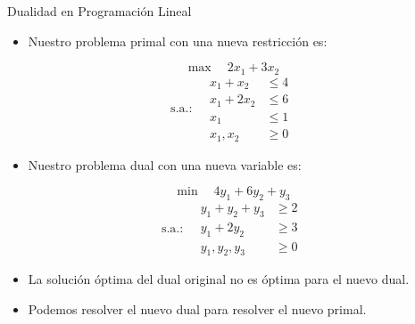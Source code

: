 \documentclass{beamer}
\begin{document}
\begin{frame}{Dualidad en Programación Lineal}
    \begin{itemize}
        \item Nuestro problema primal con una nueva restricción es:
    \end{itemize}

    \[
    \max \quad 2x_1 + 3x_2
    \]
    \[
    \text{s.a.:} \quad
    \begin{aligned}
        x_1 + x_2 &\leq 4 \\
        x_1 + 2x_2 &\leq 6 \\
        x_1 &\leq 1 \\
        x_1, x_2 &\geq 0
    \end{aligned}
    \]

    \vspace{0.5cm}

    \begin{itemize}
        \item Nuestro problema dual con una nueva variable es:
    \end{itemize}

    \[
    \min \quad 4y_1 + 6y_2 + y_3
    \]
    \[
    \text{s.a.:} \quad
    \begin{aligned}
        y_1 + y_2 + y_3 &\geq 2 \\
        y_1 + 2y_2 &\geq 3 \\
        y_1, y_2, y_3 &\geq 0
    \end{aligned}
    \]

    \begin{itemize}
        \item La solución óptima del dual original no es óptima para el nuevo dual.
        \item Podemos resolver el nuevo dual para resolver el nuevo primal.
    \end{itemize}
\end{frame}
\end{document}
